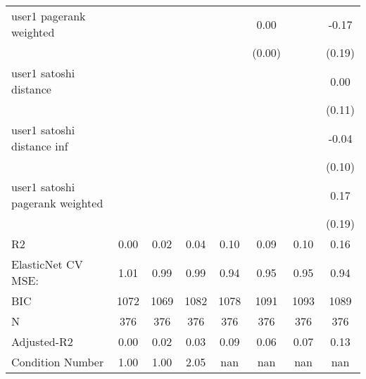 \begin{table*}
\begin{center}
\begin{tabular}{lccccccc}
user1 pagerank weighted                        &          &            &         &         & 0.00     &                    & -0.17     \\
                                               &          &            &         &         & (0.00)   &                    & (0.19)    \\
user1 satoshi distance                         &          &            &         &         &          &                    & 0.00      \\
                                               &          &            &         &         &          &                    & (0.11)    \\
user1 satoshi distance inf                     &          &            &         &         &          &                    & -0.04     \\
                                               &          &            &         &         &          &                    & (0.10)    \\
user1 satoshi pagerank weighted                &          &            &         &         &          &                    & 0.17      \\
                                               &          &            &         &         &          &                    & (0.19)    \\
R2                                             & 0.00     & 0.02       & 0.04    & 0.10    & 0.09     & 0.10               & 0.16      \\
ElasticNet CV MSE:                             & 1.01     & 0.99       & 0.99    & 0.94    & 0.95     & 0.95               & 0.94      \\
BIC                                            & 1072     & 1069       & 1082    & 1078    & 1091     & 1093               & 1089      \\
N                                              & 376      & 376        & 376     & 376     & 376      & 376                & 376       \\
Adjusted-R2                                    & 0.00     & 0.02       & 0.03    & 0.09    & 0.06     & 0.07               & 0.13      \\
Condition Number                               & 1.00     & 1.00       & 2.05    & nan     & nan      & nan                & nan       \\
\hline
\end{tabular}
\end{center}
\end{table*}
